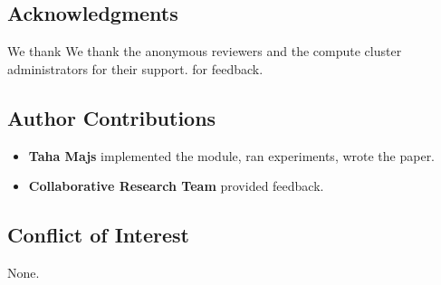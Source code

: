 \subsection{Acknowledgments}

We thank We thank the anonymous reviewers and the compute cluster administrators for their support. for feedback.

\subsection{Author Contributions}

\begin{itemize}
\item \textbf{Taha Majs} implemented the module, ran experiments, wrote the paper.
\item \textbf{Collaborative Research Team} provided feedback.

\end{itemize}
\subsection{Conflict of Interest}

None.

